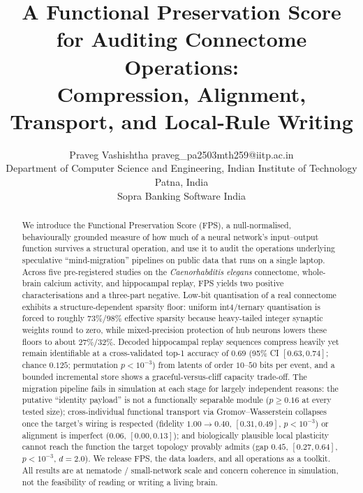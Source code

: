 \documentclass[10pt]{article}
\title{A Functional Preservation Score for Auditing Connectome Operations:\\
Compression, Alignment, Transport, and Local-Rule Writing}
\author{\name Praveg Vashishtha \email praveg\_pa2503mth259@iitp.ac.in \\
  \addr Department of Computer Science and Engineering, Indian Institute of Technology Patna, India \\
  \addr Sopra Banking Software India}
\begin{document}
\maketitle

\begin{abstract}
We introduce the Functional Preservation Score (FPS), a null-normalised, behaviourally grounded
measure of how much of a neural network's input--output function survives a structural operation,
and use it to audit the operations underlying speculative ``mind-migration'' pipelines on public
data that runs on a single laptop. Across five pre-registered studies on the \emph{Caenorhabditis
elegans} connectome, whole-brain calcium activity, and hippocampal replay, FPS yields two positive
characterisations and a three-part negative. Low-bit quantisation of a real connectome exhibits a
structure-dependent sparsity floor: uniform int4/ternary quantisation is forced to roughly
$73\%/98\%$ effective sparsity because heavy-tailed integer synaptic weights round to zero, while
mixed-precision protection of hub neurons lowers these floors to about $27\%/32\%$. Decoded
hippocampal replay sequences compress heavily yet remain identifiable at a cross-validated top-1
accuracy of $0.69$ (95\% CI $[0.63,0.74]$; chance $0.125$; permutation $p<10^{-3}$) from latents of
order $10$--$50$ bits per event, and a bounded incremental store shows a graceful-versus-cliff
capacity trade-off. The migration pipeline fails in simulation at each stage for largely
independent reasons: the putative ``identity payload'' is not a functionally separable module
($p\geq0.16$ at every tested size); cross-individual functional transport via Gromov--Wasserstein
collapses once the target's wiring is respected (fidelity $1.00\!\to\!0.40$, $[0.31,0.49]$,
$p<10^{-3}$) or alignment is imperfect ($0.06$, $[0.00,0.13]$); and biologically plausible local
plasticity cannot reach the function the target topology provably admits (gap $0.45$,
$[0.27,0.64]$, $p<10^{-3}$, $d=2.0$). We release FPS, the data loaders, and all operations as a
toolkit. All results are at nematode / small-network scale and concern coherence in simulation,
not the feasibility of reading or writing a living brain.
\end{abstract}
\end{document}

